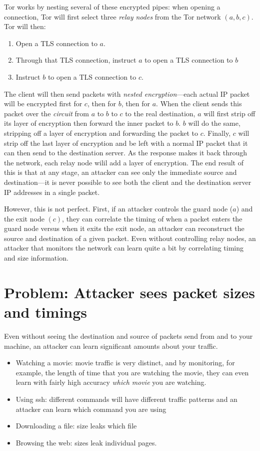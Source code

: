 Tor works by nesting several of these encrypted pipes: when opening a connection, Tor will first select three \emph{relay nodes} from the Tor network $(a, b, c)$. Tor will then:
\begin{enumerate}
	\item Open a TLS connection to $a$.
	\item Through that TLS connection, instruct $a$ to open a TLS connection to $b$
	\item Instruct $b$ to open a TLS connection to $c$.
\end{enumerate}

The client will then send packets with \emph{nested encryption}---each actual IP packet will be encrypted first for $c$, then for $b$, then for $a$. When the client sends this packet over the \emph{circuit} from $a$ to $b$ to $c$ to the real destination, $a$ will first strip off its layer of encryption then forward the inner packet to $b$. $b$ will do the same, stripping off a layer of encryption and forwarding the packet to $c$. Finally, $c$ will strip off the last layer of encryption and be left with a normal IP packet that it can then send to the destination server. As the response makes it back through the network, each relay node wilil add a layer of encryption. The end result of this is that at any stage, an attacker can see only the immediate source and destination---it is never possible to see both the client and the destination server IP addresses in a single packet.

However, this is not perfect. First, if an attacker controls the guard node ($a$) and the exit node $(c)$, they can correlate the timing of when a packet enters the guard node versus when it exits the exit node, an attacker can reconstruct the source and destination of a given packet. Even without controlling relay nodes, an attacker that monitors the network can learn quite a bit by correlating timing and size information.

\section{Problem: Attacker sees packet sizes and timings}
Even without seeing the destination and source of packets send from and to your machine, an attacker can learn significant amounts about your traffic.
\begin{itemize}
	\item Watching a movie: movie traffic is very distinct, and by monitoring, for example, the length of time that you are watching the movie, they can even learn with fairly high accuracy \emph{which movie} you are watching.
	\item Using ssh: different commands will have different traffic patterns and an attacker can learn which command you are using
	\item Downloading a file: size leaks which file
	\item Browsing the web: sizes leak individual pages.
\end{itemize}

